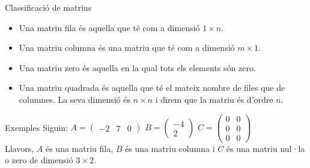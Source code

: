 \documentclass{beamer}
\begin{document}
\begin{frame}{Classificació de matrius}
\begin{itemize}
\item
Una matriu fila és aquella que té com a dimensió $1\times n$.
\item
Una matriu columna és una matriu que té com a dimensió $m\times1$.
\item
Una matriu zero és aquella en la qual tots els elements són zero.
\item
Una matriu quadrada és aquella que té el mateix nombre de files que de columnes. La seva dimensió és $n\times n$ i direm que la matriu és d'ordre $n$.
\end{itemize}
\end{frame}
\begin{frame}
\begin{exampleblock}{Exemples}
Siguin:
$A=\left(\begin{array}{ccc}
-2 & 7 & 0
\end{array}\right)
$
$B=\left(\begin{array}{c}
-4\\
2
\end{array}\right)
$
$C=\left(\begin{array}{cc}
0 & 0\\
0 & 0\\
0 & 0
\end{array}\right)
$\\ Llavors, $A$ és una matriu fila, $B$ és una matriu columna i $C$ és una matriu nul·la o zero de dimensió $3\times 2$.
\end{exampleblock}
\end{frame}
\end{document}
